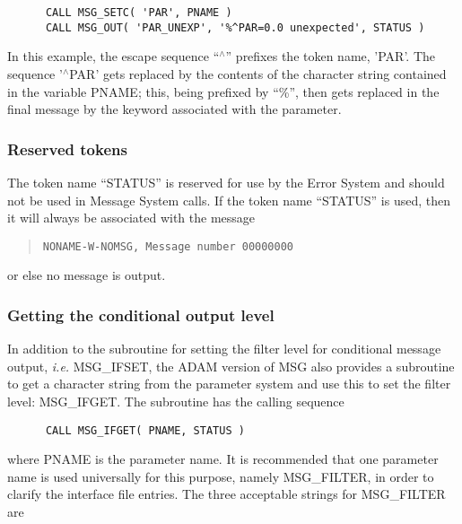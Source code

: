 \begin {small}
\begin{verbatim}
      CALL MSG_SETC( 'PAR', PNAME )
      CALL MSG_OUT( 'PAR_UNEXP', '%^PAR=0.0 unexpected', STATUS )
\end{verbatim}
\end {small}

In this example, the escape sequence ``$^\wedge$'' prefixes the token name,
'PAR'. 
The sequence '$^\wedge$PAR' gets replaced by the contents of the character
string contained in the variable PNAME; this, being prefixed by ``\%'', then
gets replaced in the final message by the keyword associated with the
parameter. 


\subsubsection {Reserved tokens}

The token name ``STATUS'' is reserved for use by the Error System and should
not be used in Message System calls.
If the token name ``STATUS'' is used, then it will always be associated with
the message 

\begin {quote}
\begin {small}
\begin{verbatim}
NONAME-W-NOMSG, Message number 00000000
\end{verbatim}
\end {small}
\end {quote}

or else no message is output.


\subsubsection {Getting the conditional output level}

In addition to the subroutine for setting the filter level for conditional
message output, {\em i.e.} MSG\_IFSET, the ADAM version of MSG also provides 
a subroutine to get a character string from the parameter system and use
this to set the filter level: MSG\_IFGET.
The subroutine has the calling sequence

\begin {small}
\begin{verbatim}
      CALL MSG_IFGET( PNAME, STATUS )
\end{verbatim}
\end {small}

where PNAME is the parameter name.
It is recommended that one parameter name is used universally for this purpose,
namely MSG\_FILTER, in order to clarify the interface file entries.
The three acceptable strings for MSG\_FILTER are

